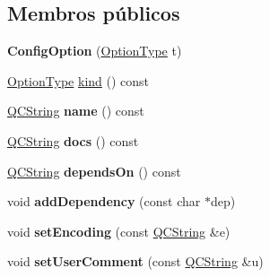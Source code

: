 \subsection*{Membros públicos}
\begin{DoxyCompactItemize}
\item 
\hypertarget{class_config_option_a981c205e18e00a0f9908691190bfba90}{{\bfseries Config\-Option} (\hyperlink{class_config_option_a976bded296a67e09242af85291a639d6}{Option\-Type} t)}\label{class_config_option_a981c205e18e00a0f9908691190bfba90}

\item 
\hyperlink{class_config_option_a976bded296a67e09242af85291a639d6}{Option\-Type} \hyperlink{class_config_option_a263e7663e23978694a454c4155d10d6b}{kind} () const 
\item 
\hypertarget{class_config_option_af92302878527ec555ba9e3fe066925ff}{\hyperlink{class_q_c_string}{Q\-C\-String} {\bfseries name} () const }\label{class_config_option_af92302878527ec555ba9e3fe066925ff}

\item 
\hypertarget{class_config_option_a382d8459d465104f4b8814838d2feca9}{\hyperlink{class_q_c_string}{Q\-C\-String} {\bfseries docs} () const }\label{class_config_option_a382d8459d465104f4b8814838d2feca9}

\item 
\hypertarget{class_config_option_ac1e12df41db1966fe2ff8f8703bdd7c7}{\hyperlink{class_q_c_string}{Q\-C\-String} {\bfseries depends\-On} () const }\label{class_config_option_ac1e12df41db1966fe2ff8f8703bdd7c7}

\item 
\hypertarget{class_config_option_ab7ce57760071e4a76697349f01e8c100}{void {\bfseries add\-Dependency} (const char $\ast$dep)}\label{class_config_option_ab7ce57760071e4a76697349f01e8c100}

\item 
\hypertarget{class_config_option_a8f08440c4bcc057442af74901a62428a}{void {\bfseries set\-Encoding} (const \hyperlink{class_q_c_string}{Q\-C\-String} \&e)}\label{class_config_option_a8f08440c4bcc057442af74901a62428a}

\item 
\hypertarget{class_config_option_a91738970409db86f29ad17182728b31c}{void {\bfseries set\-User\-Comment} (const \hyperlink{class_q_c_string}{Q\-C\-String} \&u)}\label{class_config_option_a91738970409db86f29ad17182728b31c}

\end{DoxyCompactItemize}
